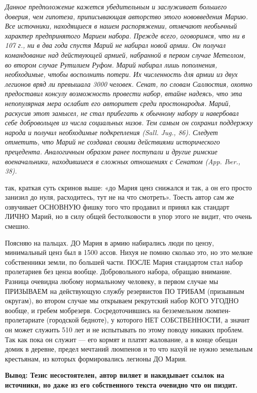 \textit{Данное предположение кажется убедительным и заслуживает большего доверия, чем гипотеза, приписывающая авторство этого нововведения Марию. Все источники, находящиеся в нашем распоряжении, отмечают необычный характер предпринятого Марием набора. Прежде всего, оговоримся, что ни в 107 г., ни в два года спустя Марий не набирал новой армии. Он получал командование над действующей армией, набранной в первом случае Метеллом, во втором случае Рутилием Руфом. Марий набирал лишь пополнения, необходимые, чтобы восполнить потери. Их численность для армии из двух легионов вряд ли превышала 3000 человек. Сенат, по словам Саллюстия, охотно предоставил консулу возможность провести набор, втайне надеясь, что эта непопулярная мера ослабит его авторитет среди простонародья. Марий, раскусив этот замысел, не стал прибегать к обычному набору и навербовал себе добровольцев из числа социальных низов. Тем самым он сохранил поддержку народа и получил необходимые подкрепления (Sall. Jug., 86). Следует отметить, что Марий не создавал своими действиями исторического прецедента. Аналогичным образом ранее поступали и другие римские военачальники, находившиеся в сложных отношениях с Сенатом (App. Iber., 38).}

так, краткая суть скринов выше: «до Мария ценз снижался и так, а он его просто занизил до нуля, расходитесь, тут не на что смотреть». Тоесть автор сам же озвучивает ОСНОВНУЮ фишку того что продавил и принял как стандарт ЛИЧНО Марий, но в силу общей бестолковости в упор этого не видит, что очень смешно.


Поясняю на пальцах. ДО Мария в армию набирались люди по цензу, минимальный ценз был в 1500 ассов. Нихуя не помню сколько это, но это мелкие собственники земли, по большей части. ПОСЛЕ Мария стандартом стал набор пролетариев без ценза вообще. Добровольного набора, обращаю внимание. Разница очевидна любому нормальному человеку, в первом случае мы ПРИЗЫВАЕМ на действующую службу резервистов ПО ТРИБАМ (призывным округам), во втором случае мы открываем рекрутский набор КОГО УГОДНО вообще, и гребем мобрезерв. Сосредоточившись на безземельном люмпен-пролетариате (городской бедноте), у которого НЕТ СОБСТВЕННОСТИ, а значит он может служить 510 лет и не испытывать по этому поводу никаких проблем. Так как пока он служит — его кормят и платят жалование, а в конце обещан домик в деревне, предел мечтаний люмпенов и то что нахуй не нужно земельным крестьянам, из которых формировались легионы ДО Мария.


\textbf{Вывод: Тезис несостоятелен, автор виляет и накидывает ссылок на источники, но даже из его собственного текста очевидно что он пиздит.}

